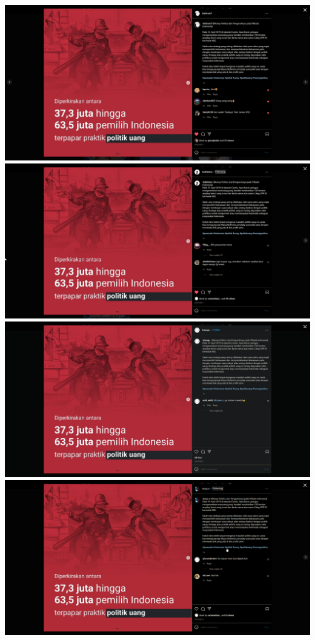 \documentclass[12pt]{article}
\begin{document}
\begin{minipage}[c]{0.47\textwidth}
    \includegraphics[width=\textwidth,keepaspectratio]{Asset/rivo.png}
    \includegraphics[width=\textwidth,keepaspectratio]{Asset/jaki.png}
    \includegraphics[width=\textwidth,keepaspectratio]{Asset/farhan.png}
    \includegraphics[width=\textwidth,keepaspectratio]{Asset/resnu.png}
\end{minipage}
\end{document}
